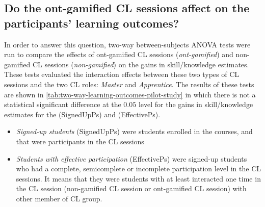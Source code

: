 \newpage
\subsection*{Do the ont-gamified CL sessions affect on the participants' learning outcomes?}

In order to answer this question, two-way between-subjects ANOVA tests were run to compare the effects of ont-gamified CL sessions (\emph{ont-gamified}) and non-gamified CL sessions (\emph{non-gamified}) on the gains in skill/knowledge estimates.
These tests evaluated the interaction effects between these two types of CL sessions and the two CL roles: \emph{Master} and \emph{Apprentice}.
The results of these tests are shown in \autoref{tab:two-way-learning-outcomes-pilot-study} in which there is not a statistical significant difference at the $0.05$ level for the gains in skill/knowledge estimates for the  (SignedUpPs) and  (EffectivePs).
\begin{itemize}
\item 
\emph{Signed-up students} (SignedUpPs) were students enrolled in the courses, and that were participants in the CL sessions
\item
\emph{Students with effective participation} (EffectivePs) were signed-up students who had a complete, semicomplete or incomplete participation level in the CL sessions.
It means that they were students with at least interacted one time in the CL session (non-gamified CL session or ont-gamified CL session) with other member of CL group.
\end{itemize}

